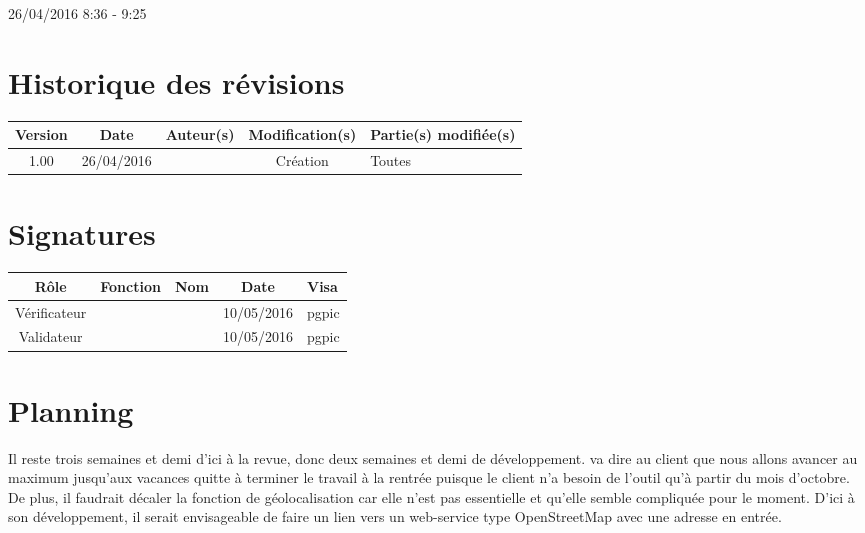 \documentclass [a4paper] {article}
\begin{document}
26/04/2016			 				%
\hfill   
\hfill 	 8:36 - 9:25				%



\section*{Historique des révisions}
\begin{center}
			\begin{tabular}{| c | c | c | c | p{4cm} |}
				\hline
				\rowcolor{Gray}
				Version & Date & Auteur(s) & Modification(s) & Partie(s) modifiée(s)		 \\
				\hline
				1.00 & 26/04/2016 & \Pierre & Création & Toutes \\
		\hline		
			\end{tabular}
		\end{center}

\section*{Signatures}

		\begin{center}
			\begin{tabular}{| c | c | c | c | p{4cm} |}
				\hline
				\rowcolor{Gray}
				Rôle & Fonction & Nom & Date & Visa		 \\
				\hline
				Vérificateur & \RQA & \Kafui & 10/05/2016 & pgpic \\[30pt]
				\hline
				Validateur & \CP & \Sergi & 10/05/2016 & pgpic \\[30pt]	
				\hline
			\end{tabular}
		\end{center}


\section{Planning}
Il reste trois semaines et demi d'ici à la revue, donc deux semaines et demi de développement. \Sergi{} va dire au client que nous allons avancer au maximum jusqu'aux vacances quitte à terminer le travail à la rentrée puisque le client n'a besoin de l'outil qu'à partir du mois d'octobre. De plus, il faudrait décaler la fonction de géolocalisation car elle n'est pas essentielle et qu'elle semble compliquée pour le moment. D'ici à son développement, il serait envisageable de faire un lien vers un web-service type OpenStreetMap avec une adresse en entrée.
\end{document}
